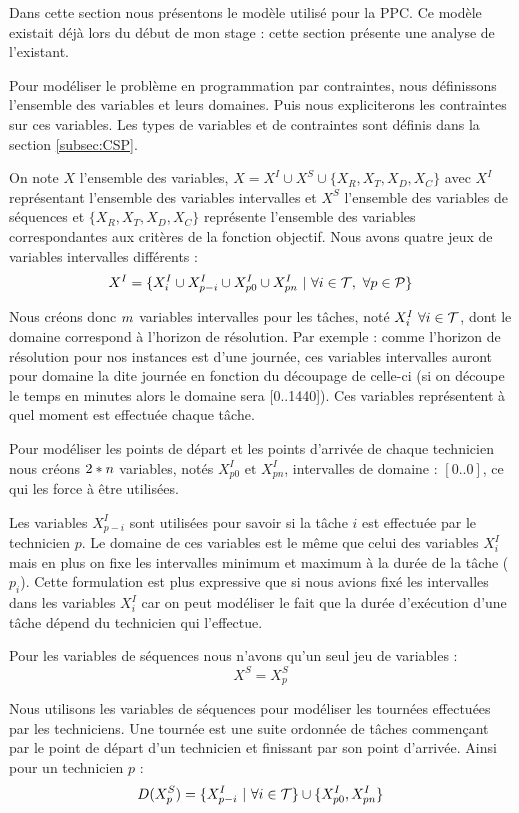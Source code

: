 Dans cette section nous présentons le modèle utilisé pour la PPC.
Ce modèle existait déjà lors du début de mon stage :  cette section présente une analyse de l'existant.

Pour modéliser le problème en programmation par contraintes, nous définissons l'ensemble des variables et leurs domaines. 
Puis nous expliciterons les contraintes sur ces variables.
Les types de variables et de contraintes sont définis dans la section \ref{subsec:CSP}.

On note $X$ l'ensemble des variables, $X=X^I\cup X^S \cup \{X_{R},X_{T},X_{D},X_{C}\}$ avec $X^I$ représentant l'ensemble des variables intervalles et $X^S$ l'ensemble des variables de séquences et $\{X_{R},X_{T},X_{D},X_{C}\}$ représente l'ensemble des variables correspondantes aux critères de la fonction objectif.
Nous avons quatre jeux de variables intervalles différents :
$$X^I =\{ X_i^I \cup X_{p-i}^I \cup X_{p0}^I\cup X_{pn}^I ~|~ \forall i \in \mathcal{T}, ~\forall p \in \mathcal{P}\}$$

Nous créons donc $m$ variables intervalles pour les tâches, noté $X_i^I~ \forall i \in \mathcal{T}$, dont le domaine correspond à l'horizon de résolution.
Par exemple : comme l'horizon de résolution pour nos instances est d'une journée, ces variables intervalles auront pour domaine la dite journée en fonction du découpage de celle-ci (si on découpe le temps en minutes alors le domaine sera [0..1440]). Ces variables représentent à quel moment est effectuée chaque tâche.

Pour modéliser les points de départ et les points d'arrivée de chaque technicien nous créons $2*n$ variables, notés $X_{p0}^I\text{~et~} X_{pn}^I$, intervalles de domaine : $[0..0]$, ce qui les force à être utilisées.

Les variables $X_{p-i}^I$ sont utilisées pour savoir si la tâche $i$ est effectuée par le technicien $p$. Le domaine de ces variables est le même que celui des variables $X_i^I$ mais en plus on fixe les intervalles minimum et maximum à la durée de la tâche ($p_i$). Cette formulation est plus expressive que si nous avions fixé les intervalles dans les variables $X_i^I$ car on peut modéliser le fait que la durée d'exécution d'une tâche dépend du technicien qui l'effectue.


Pour les variables de séquences nous n'avons qu'un seul jeu de variables :
$$X^S = X_p^S$$ 


Nous utilisons les variables de séquences pour modéliser les tournées effectuées par les techniciens. Une tournée est une suite ordonnée de tâches commençant par le point de départ d'un technicien et finissant par son point d'arrivée. Ainsi pour un technicien $p$ : 
$$ D(X_p^S) = \{X_{p-i}^I ~|~ \forall i \in \mathcal{T}\} \cup \{X_{p0}^I,X_{pn}^I\}$$

